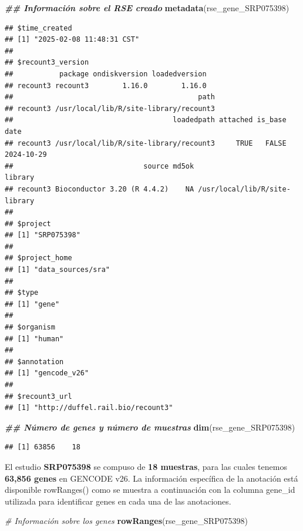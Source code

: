 \documentclass[
]{article}
\newenvironment{Shaded}{\begin{snugshade}}{\end{snugshade}}
\newcommand{\CommentTok}[1]{\textcolor[rgb]{0.56,0.35,0.01}{\textit{#1}}}
\newcommand{\DocumentationTok}[1]{\textcolor[rgb]{0.56,0.35,0.01}{\textbf{\textit{#1}}}}
\newcommand{\FunctionTok}[1]{\textcolor[rgb]{0.13,0.29,0.53}{\textbf{#1}}}
\newcommand{\NormalTok}[1]{#1}
\begin{document}
\begin{Shaded}
\begin{Highlighting}[]
\DocumentationTok{\#\# Información sobre el RSE creado}
\FunctionTok{metadata}\NormalTok{(rse\_gene\_SRP075398)}
\end{Highlighting}
\end{Shaded}

\begin{verbatim}
## $time_created
## [1] "2025-02-08 11:48:31 CST"
## 
## $recount3_version
##           package ondiskversion loadedversion
## recount3 recount3        1.16.0        1.16.0
##                                            path
## recount3 /usr/local/lib/R/site-library/recount3
##                                      loadedpath attached is_base       date
## recount3 /usr/local/lib/R/site-library/recount3     TRUE   FALSE 2024-10-29
##                               source md5ok                       library
## recount3 Bioconductor 3.20 (R 4.4.2)    NA /usr/local/lib/R/site-library
## 
## $project
## [1] "SRP075398"
## 
## $project_home
## [1] "data_sources/sra"
## 
## $type
## [1] "gene"
## 
## $organism
## [1] "human"
## 
## $annotation
## [1] "gencode_v26"
## 
## $recount3_url
## [1] "http://duffel.rail.bio/recount3"
\end{verbatim}

\begin{Shaded}
\begin{Highlighting}[]
\DocumentationTok{\#\# Número de genes y número de muestras}
\FunctionTok{dim}\NormalTok{(rse\_gene\_SRP075398)}
\end{Highlighting}
\end{Shaded}

\begin{verbatim}
## [1] 63856    18
\end{verbatim}

El estudio \textbf{SRP075398} se compuso de \textbf{18 muestras}, para
las cuales tenemos \textbf{63,856 genes} en GENCODE v26. La información
específica de la anotación está disponible rowRanges() como se muestra a
continuación con la columna gene\_id utilizada para identificar genes en
cada una de las anotaciones.

\begin{Shaded}
\begin{Highlighting}[]
\CommentTok{\# Información sobre los genes}
\FunctionTok{rowRanges}\NormalTok{(rse\_gene\_SRP075398)}
\end{Highlighting}
\end{Shaded}
\end{document}
